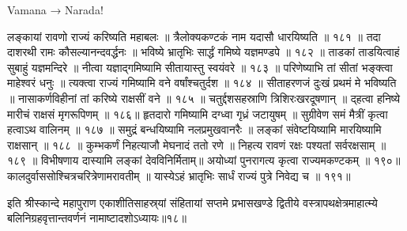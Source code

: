 Vamana → Narada!

लङ्कायां रावणो राज्यं करिष्यति महाबलः ॥
त्रैलोक्यकण्टकं नाम यदासौ धारयिष्यति ॥ १८१ ॥
तदा दाशरथी रामः कौसल्यानन्दवर्द्धनः ॥
भविष्ये भ्रातृभिः सार्द्धं गमिष्ये यज्ञमण्डपे ॥ १८२ ॥
ताडकां ताडयित्वाहं सुबाहुं यज्ञमन्दिरे ॥
नीत्वा यज्ञाद्गमिष्यामि सीतायास्तु स्वयंवरे ॥ १८३ ॥
परिणेष्याभि तां सीतां भङ्क्त्वा माहेश्वरं धनुः ॥
त्यक्त्वा राज्यं गमिष्यामि वने वर्षांश्चतुर्दश ॥ १८४ ॥
सीताहरणजं दुःखं प्रथमं मे भविष्यति ॥
नासाकर्णविहीनां तां करिष्ये राक्षसीं वने ॥ १८५ ॥
चतुर्द्दशसहस्राणि त्रिशिरःखरदूषणान् ॥
द्हत्वा हनिष्ये मारीचं राक्षसं मृगरूपिणम् ॥ १८६॥
हृतदारो गमिष्यामि दग्ध्वा गृध्रं जटायुषम् ॥
सुग्रीवेण समं मैत्रीं कृत्वा हत्वाऽथ वालिनम् ॥ १८७ ॥
समुद्रं बन्धयिष्यामि नलप्रमुखवानरैः ॥
लङ्कां संवेष्टयिष्यामि मारयिष्यामि राक्षसान् ॥ १८८ ॥
कुम्भकर्णं निहत्याजौ मेघनादं ततो रणे ॥
निहत्य रावणं रक्षः पश्यतां सर्वरक्षसाम् ॥ १८९ ॥
विभीषणाय दास्यामि लङ्कां देवविनिर्मिताम्॥
अयोध्यां पुनरागत्य कृत्वा राज्यमकण्टकम् ॥ १९०॥
कालदुर्वाससोश्चित्रचरित्रेणामरावतीम् ॥
यास्येऽहं भ्रातृभिः सार्धं राज्यं पुत्रे निवेद्य च ॥ १९१॥

इति श्रीस्कान्दे महापुराण एकाशीतिसाहस्र्यां संहितायां सप्तमे प्रभासखण्डे द्वितीये वस्त्रापथक्षेत्रमाहात्म्ये बलिनिग्रहवृत्तान्तवर्णनं नामाष्टादशोऽध्यायः॥१८॥
